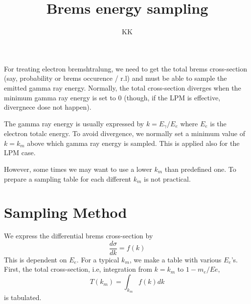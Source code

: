 \documentclass[a4paper]{article}
\title{Brems energy sampling}
\author{KK}
\begin{document}
 \maketitle
 For  treating electron bremshtralung, we need to get the total brems 
 cross-section  (say, probability or brems occurence / r.l)  and must be able
 to sample the emitted gamma ray energy. Normally, the total cross-section
 diverges when the minimum gamma ray energy  is set to 0 (though, if the
  LPM is effective, divergnece dose not happen).

  The gamma ray energy is  usually expressed by $k=E_\gamma/E_e$ where
  $E_e$ is the electron totalc energy.  To avoid divergence, we normally
  set a minimum value of  $k=k_{m}$ above which  gamma ray energy is
  sampled. This is applied also for the LPM case.

  However, some times we may want to use a  lower $k_{m}$ than
  predefined one. To prepare a sampling table for each different $k_m$
  is not practical.

  

  \section{Sampling Method}
  We express the differential brems cross-section by
  \begin{equation}
     \frac{d\sigma}{dk}=f(k)
  \end{equation}
  This is dependent on $E_e$.
  For a typical $k_m$, we make a table with various $E_e$'s.
First,  the total cross-section, i.e,  integration from $k=k_{m} $ to  $1-m_e/Ee$,
\begin{equation}
   T(k_m)= \int_{k_m} f(k)dk
\end{equation}
is  tabulated. 
\end{document}
